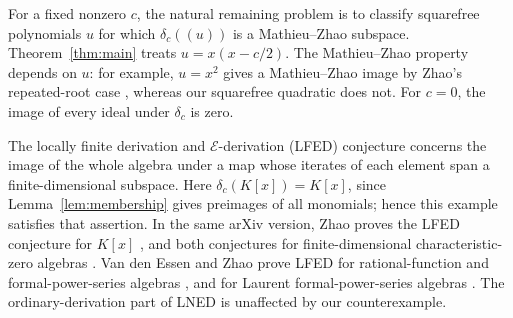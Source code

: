 \documentclass[11pt]{article}
\newcommand{\E}{\mathcal{E}}
\begin{document}
For a fixed nonzero $c$, the natural remaining problem is to classify
squarefree polynomials $u$ for which $\delta_c((u))$ is a
Mathieu--Zhao subspace. Theorem~\ref{thm:main} treats $u=x(x-c/2)$.
The Mathieu--Zhao property depends on $u$: for example,
$u=x^2$ gives a Mathieu--Zhao image by Zhao's repeated-root case
\cite[Theorem~1.6(3)]{zhao-univariate}, whereas our squarefree quadratic does not.
For $c=0$, the image of every ideal under $\delta_c$ is zero.

The locally finite derivation and $\E$-derivation (LFED) conjecture \cite[Conjecture~1.5]{zhao-general} concerns the image of the
whole algebra under a map whose iterates of each element span a
finite-dimensional subspace. Here $\delta_c(K[x])=K[x]$, since
Lemma~\ref{lem:membership} gives preimages of all monomials; hence this
example satisfies that assertion. In the same arXiv version, Zhao proves the LFED conjecture for $K[x]$
\cite[Theorem~1.5]{zhao-univariate}, and both conjectures for
finite-dimensional characteristic-zero algebras
\cite[Proposition~2.4]{zhao-algebraic}. Van den Essen and Zhao prove LFED
for rational-function and formal-power-series algebras
\cite[Corollaries~2.5 and~2.8]{essen-zhao-lfed}, and for Laurent
formal-power-series algebras \cite[Theorems~3.1--3.2]{essen-zhao-lfed}. The ordinary-derivation
part of LNED is unaffected by our counterexample.
\end{document}
